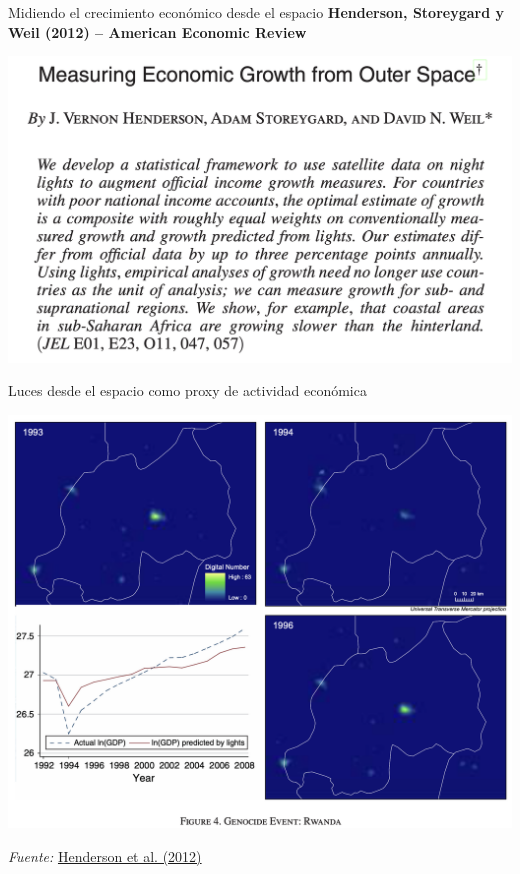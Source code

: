 \documentclass{beamer}
\begin{document}
\begin{frame}{Midiendo el crecimiento económico desde el espacio}
\vspace{-0.5em}
\small
\textbf{Henderson, Storeygard y Weil (2012) – American Economic Review}
\begin{center}
\includegraphics[scale=0.25]{figures/paper_gdp_1}
\end{center}
\end{frame}

\begin{frame}{Luces desde el espacio como proxy de actividad económica}
\begin{center}
\includegraphics[scale=0.25]{figures/paper_gdp_2}
\end{center}
\textit{Fuente:} \href{https://doi.org/10.1257/aer.102.2.994}{Henderson et al. (2012)}
\end{frame}
\end{document}
